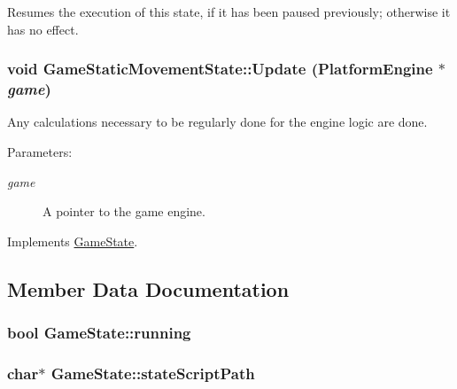 Resumes the execution of this state, if it has been paused previously; otherwise it has no effect. \hypertarget{class_game_static_movement_state_5a3bd910a85487be371c088a1be16996}{
\subsubsection[{Update}]{\setlength{\rightskip}{0pt plus 5cm}void GameStaticMovementState::Update ({\bf PlatformEngine} $\ast$ {\em game})}}
\label{d7/d3b/class_game_static_movement_state_5a3bd910a85487be371c088a1be16996}


Any calculations necessary to be regularly done for the engine logic are done.

\begin{Desc}
\item[Parameters:]
\begin{description}
\item[{\em game}]A pointer to the game engine. \end{description}
\end{Desc}


Implements \hyperlink{class_game_state_100ca49bc95afce1d5c5b756708bbc2b}{GameState}.

\subsection{Member Data Documentation}
\hypertarget{class_game_state_391df04a740c7480270d3c71a578b43a}{
\subsubsection[{running}]{\setlength{\rightskip}{0pt plus 5cm}bool {\bf GameState::running}}}
\label{dd/d87/class_game_state_391df04a740c7480270d3c71a578b43a}


\hypertarget{class_game_state_bfe09abe78dd5794426964d3392b2973}{
\subsubsection[{stateScriptPath}]{\setlength{\rightskip}{0pt plus 5cm}char$\ast$ {\bf GameState::stateScriptPath}}}
\label{dd/d87/class_game_state_bfe09abe78dd5794426964d3392b2973}


